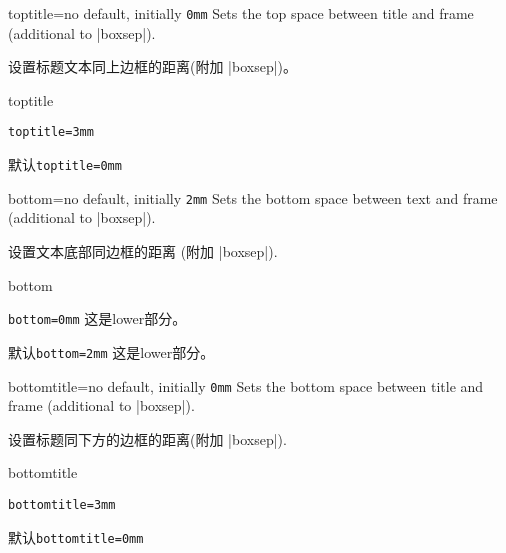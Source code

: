 \begin{docTcbKey}{toptitle}{=}{no default, initially \texttt{0mm}}
  Sets the top space between title and frame (additional to |boxsep|).

设置标题文本同上边框的距离(附加 |boxsep|)。    
\begin{exdispExample}{toptitle}

\begin{tcolorbox}[toptitle=3mm,title=My title]
\verb|toptitle=3mm|
\end{tcolorbox}
%
\begin{tcolorbox}[title=My title]
默认\verb|toptitle=0mm|
\end{tcolorbox}
\end{exdispExample}
\end{docTcbKey}



\begin{docTcbKey}{bottom}{=}{no default, initially \texttt{2mm}}
Sets the bottom space between text and frame (additional to |boxsep|).

设置文本底部同边框的距离 (附加 |boxsep|).
\begin{exdispExample}{bottom}

\begin{tcolorbox}[bottom=0mm]
\verb|bottom=0mm|
\tcblower
这是lower部分。
\end{tcolorbox}
\begin{tcolorbox}
默认\verb|bottom=2mm|
\tcblower
这是lower部分。
\end{tcolorbox}
\end{exdispExample}
\end{docTcbKey}

\begin{docTcbKey}{bottomtitle}{=}{no default, initially \texttt{0mm}}
  Sets the bottom space between title and frame (additional to |boxsep|).

设置标题同下方的边框的距离(附加 |boxsep|).
\begin{exdispExample}{bottomtitle}

\begin{tcolorbox}[bottomtitle=3mm,title=My title]
\verb|bottomtitle=3mm|
\end{tcolorbox}
\begin{tcolorbox}[title=My title]
默认\verb|bottomtitle=0mm|
\end{tcolorbox}
\end{exdispExample}
\end{docTcbKey}


